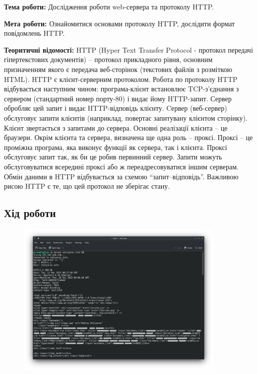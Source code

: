 \documentclass[12pt]{extarticle}
\begin{document}
\textbf{Тема роботи:} Дослідження роботи web-сервера та протоколу HTTP.
\vspace{12pt}

\textbf{Мета роботи:} Ознайомитися основами протоколу HTTP, дослідити формат
повідомлень HTTP.

\textbf{Теоритичні відомості:}
HTTP (Hyper Text Transfer Protocol - протокол передачі гіпертекстових
документів) – протокол прикладного рівня, основним призначенням якого є
передача веб-сторінок (текстових файлів з розміткою HTML).
HTTP є клієнт-серверним протоколом. Робота по протоколу HTTP
відбувається наступним чином: програма-клієнт встановлює TCP-з'єднання з
сервером (стандартний номер порту-80) і видає йому HTTP-запит. Сервер
обробляє цей запит і видає HTTP-відповідь клієнту. Cервер (веб-сервер)
обслуговує запити клієнтів (наприклад, повертає запитувану клієнтом
сторінку).
Клієнт звертається з запитами до сервера. Основні реалізації клієнта – це
браузери. Окрім клієнта та сервера, визначена ще одна роль – проксі. Проксі –
це проміжна програма, яка виконує функції як сервера, так і клієнта. Проксі
обслуговує запит так, як би це робив первинний сервер. Запити можуть
обслуговуватися всередині проксі або ж переадресовуватися іншим серверам.
Обмін даними в HTTP відбувається за схемою “запит–відповідь”. Важливою
рисою HTTP є те, що цей протокол не зберігає стану.
\break
\subsection*{Хід роботи}



\begin{figure}[H]
    \centering
    \includegraphics[width=0.90\textwidth]{GET}
    \caption{}
\end{figure}
\end{document}
